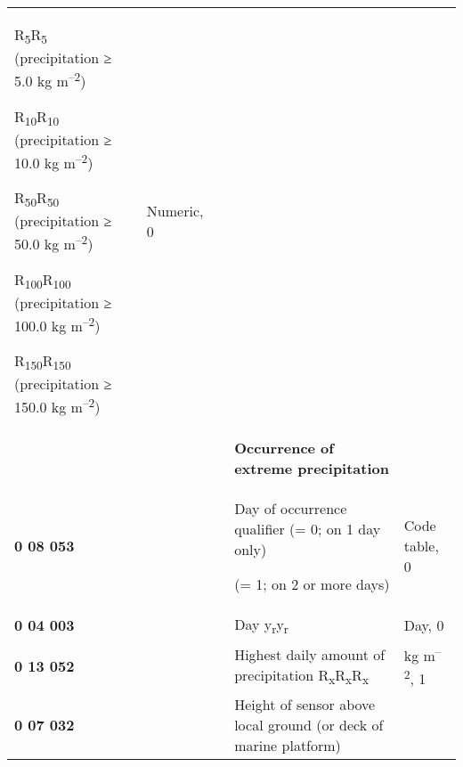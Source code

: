 \begin{longtable}[]{@{}lllll@{}}
\begin{minipage}[t]{0.17\columnwidth}
R\textsubscript{5}R\textsubscript{5} (precipitation ≥ 5.0 kg m\textsuperscript{--2})

R\textsubscript{10}R\textsubscript{10} (precipitation ≥ 10.0 kg m\textsuperscript{--2})

R\textsubscript{50}R\textsubscript{50} (precipitation ≥ 50.0 kg m\textsuperscript{--2})

R\textsubscript{100}R\textsubscript{100} (precipitation ≥ 100.0 kg m\textsuperscript{--2})

R\textsubscript{150}R\textsubscript{150} (precipitation ≥ 150.0 kg m\textsuperscript{--2})\strut
\end{minipage} & \begin{minipage}[t]{0.17\columnwidth}\raggedright
Numeric, 0\strut
\end{minipage}\tabularnewline
& & & \textbf{Occurrence of extreme precipitation} &\tabularnewline
\begin{minipage}[t]{0.17\columnwidth}\raggedright
\textbf{0 08 053}\strut
\end{minipage} & \begin{minipage}[t]{0.17\columnwidth}\raggedright
\strut
\end{minipage} & \begin{minipage}[t]{0.17\columnwidth}\raggedright
\strut
\end{minipage} & \begin{minipage}[t]{0.17\columnwidth}\raggedright
Day of occurrence qualifier (= 0; on 1 day only)

(= 1; on 2 or more days)\strut
\end{minipage} & \begin{minipage}[t]{0.17\columnwidth}\raggedright
Code table, 0\strut
\end{minipage}\tabularnewline
\textbf{0 04 003} & & & Day y\textsubscript{r}y\textsubscript{r} & Day, 0\tabularnewline
\textbf{0 13 052} & & & Highest daily amount of precipitation R\textsubscript{x}R\textsubscript{x}R\textsubscript{x} & kg m\textsuperscript{--2}, 1\tabularnewline
\begin{minipage}[t]{0.17\columnwidth}\raggedright
\textbf{0 07 032}\strut
\end{minipage} & \begin{minipage}[t]{0.17\columnwidth}\raggedright
\strut
\end{minipage} & \begin{minipage}[t]{0.17\columnwidth}\raggedright
\strut
\end{minipage} & \begin{minipage}[t]{0.17\columnwidth}\raggedright
Height of sensor above local ground (or deck of marine platform)


\end{minipage}
\end{longtable}
